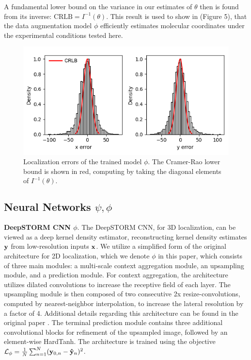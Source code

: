 \documentclass{article}
\begin{document}
A fundamental lower bound on the variance in our estimates of $\theta$ then is found from its inverse: $\mathrm{CRLB} = I^{-1}(\theta)$. This result is used to show in (Figure 5), that the data augmentation model $\phi$ efficiently estimates molecular coordinates under the experimental conditions tested here. 

\begin{figure}
\centering
\includegraphics[scale=0.7]{media/Errors.png}
\caption{Localization errors of the trained model $\phi$. The Cramer-Rao lower bound is shown in red, computing by taking the diagonal elements of $I^{-1}(\theta)$.}
\end{figure}


\subsection{Neural Networks $\psi,\phi$}

\textbf{DeepSTORM CNN $\phi$}. The DeepSTORM CNN, for 3D localization, can be viewed as a deep kernel density estimator, reconstructing kernel density estimates $\bold{y}$ from low-resolution inputs $\bold{x}$. We utilize a simplified form of the original architecture \citep{Nehme2020} for 2D localization, which we denote $\phi$ in this paper, which consists of three main modules: a multi-scale context aggregation module, an upsampling module, and a prediction module. For context aggregation, the architecture utilizes dilated convolutions to increase the receptive field of each layer. The upsampling module is then composed of two consecutive 2x resize-convolutions, computed by nearest-neighbor interpolation, to increase the lateral resolution by a factor of 4. Additional details regarding this architecture can be found in the original paper \cite{Nehme2020}. The terminal prediction module contains three additional convolutional blocks for refinement of the upsampled image, followed by an element-wise HardTanh. The architecture is trained using the objective $\mathcal{L}_{\phi} = \frac{1}{N}\sum_{n=1}^{N} (\bold{y}_{0,n}-\bold{\hat{y}}_{n})^{2}$. 
\end{document}

